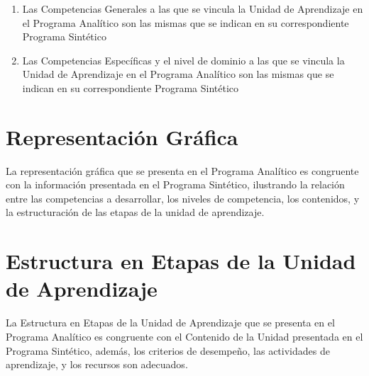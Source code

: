 \documentclass{article}
\begin{document}
\begin{Form}
\begin{enumerate}[resume,leftmargin=*,itemsep=-2pt]
\item{Las Competencias Generales a las que se vincula la Unidad de Aprendizaje en el
Programa Anal\'{i}tico son las mismas que se indican en su correspondiente Programa
Sint\'{e}tico
\begin{flushright}
  \quad%
  \end{flushright}}
\item{Las Competencias Espec\'{i}ficas y el nivel de dominio a las que se vincula la Unidad de
Aprendizaje en el Programa Anal\'{i}tico son las mismas que se indican en su correspondiente
Programa Sint\'{e}tico
\begin{flushright}
%
  \quad%
\end{flushright}}  
\end{enumerate}

\section{Representaci\'{o}n Gr\'{a}fica}

La representaci\'{o}n gr\'{a}fica que se presenta en el Programa Anal\'{i}tico es congruente con la
informaci\'{o}n presentada en el Programa Sint\'{e}tico, ilustrando la relaci\'{o}n entre las
competencias a desarrollar, los niveles de competencia, los contenidos, y la estructuraci\'{o}n
de las etapas de la unidad de aprendizaje.
\begin{flushright}
%
  \quad%
\end{flushright}

\newpage

\section{Estructura en Etapas de la Unidad de Aprendizaje}

La Estructura en Etapas de la Unidad de Aprendizaje que se presenta en el Programa
Anal\'{i}tico es congruente con el Contenido de la Unidad presentada en el Programa Sint\'{e}tico,
adem\'{a}s, los criterios de desempe\~{n}o, las actividades de aprendizaje, y los recursos son
adecuados.
\begin{flushright}
%
  \quad%
\end{flushright}
  

\end{Form}
\end{document}
